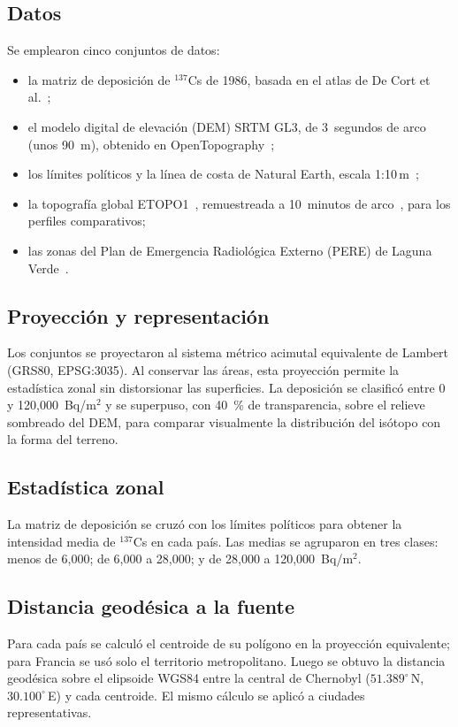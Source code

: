 \subsection{Datos}
Se emplearon cinco conjuntos de datos:
\begin{itemize}
\item la matriz de deposici\'on de $^{137}$Cs de 1986, basada en el atlas de De Cort et al.~\cite{decort1998};
\item el modelo digital de elevaci\'on (DEM) SRTM GL3, de 3~segundos de arco (unos 90~m), obtenido en OpenTopography~\cite{srtm2013};
\item los l\'imites pol\'iticos y la l\'inea de costa de Natural Earth, escala 1:10\,m~\cite{ne10};
\item la topograf\'ia global ETOPO1~\cite{etopo1}, remuestreada a 10~minutos de arco~\cite{fatiando}, para los perfiles comparativos;
\item las zonas del Plan de Emergencia Radiol\'ogica Externo (PERE) de Laguna Verde~\cite{pere2011}.
\end{itemize}

\subsection{Proyecci\'on y representaci\'on}
Los conjuntos se proyectaron al sistema m\'etrico acimutal equivalente de Lambert (GRS80, EPSG:3035). Al conservar las \'areas, esta proyecci\'on permite la estad\'istica zonal sin distorsionar las superficies. La deposici\'on se clasific\'o entre 0 y 120,000~Bq/m$^2$ y se superpuso, con 40~\% de transparencia, sobre el relieve sombreado del DEM, para comparar visualmente la distribuci\'on del is\'otopo con la forma del terreno.

\subsection{Estad\'istica zonal}
La matriz de deposici\'on se cruz\'o con los l\'imites pol\'iticos para obtener la intensidad media de $^{137}$Cs en cada pa\'is. Las medias se agruparon en tres clases: menos de 6,000; de 6,000 a 28,000; y de 28,000 a 120,000~Bq/m$^2$.

\subsection{Distancia geod\'esica a la fuente}
Para cada pa\'is se calcul\'o el centroide de su pol\'igono en la proyecci\'on equivalente; para Francia se us\'o solo el territorio metropolitano. Luego se obtuvo la distancia geod\'esica sobre el elipsoide WGS84 entre la central de Chernobyl ($51.389^\circ$\,N, $30.100^\circ$\,E) y cada centroide. El mismo c\'alculo se aplic\'o a ciudades representativas.

